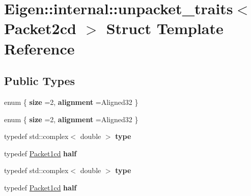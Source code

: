 \hypertarget{struct_eigen_1_1internal_1_1unpacket__traits_3_01_packet2cd_01_4}{}\section{Eigen\+:\+:internal\+:\+:unpacket\+\_\+traits$<$ Packet2cd $>$ Struct Template Reference}
\label{struct_eigen_1_1internal_1_1unpacket__traits_3_01_packet2cd_01_4}
\subsection*{Public Types}
\begin{DoxyCompactItemize}
\item 
\mbox{\label{struct_eigen_1_1internal_1_1unpacket__traits_3_01_packet2cd_01_4_a091300b9952251d509d0881c91bc395e}} 
enum \{ {\bfseries size} =2, 
{\bfseries alignment} =Aligned32
 \}
\item 
\mbox{\label{struct_eigen_1_1internal_1_1unpacket__traits_3_01_packet2cd_01_4_a9e4ff21a4c830100f33ae834a88fa43f}} 
enum \{ {\bfseries size} =2, 
{\bfseries alignment} =Aligned32
 \}
\item 
\mbox{\label{struct_eigen_1_1internal_1_1unpacket__traits_3_01_packet2cd_01_4_a8992ec950a1d1704e1ff6a8e842e2b6d}} 
typedef std\+::complex$<$ double $>$ {\bfseries type}
\item 
\mbox{\label{struct_eigen_1_1internal_1_1unpacket__traits_3_01_packet2cd_01_4_a335b4f8641e621d446ba9c0a1f94217d}} 
typedef \hyperlink{struct_eigen_1_1internal_1_1_packet1cd}{Packet1cd} {\bfseries half}
\item 
\mbox{\label{struct_eigen_1_1internal_1_1unpacket__traits_3_01_packet2cd_01_4_a8992ec950a1d1704e1ff6a8e842e2b6d}} 
typedef std\+::complex$<$ double $>$ {\bfseries type}
\item 
\mbox{\label{struct_eigen_1_1internal_1_1unpacket__traits_3_01_packet2cd_01_4_a335b4f8641e621d446ba9c0a1f94217d}} 
typedef \hyperlink{struct_eigen_1_1internal_1_1_packet1cd}{Packet1cd} {\bfseries half}
\end{DoxyCompactItemize}


